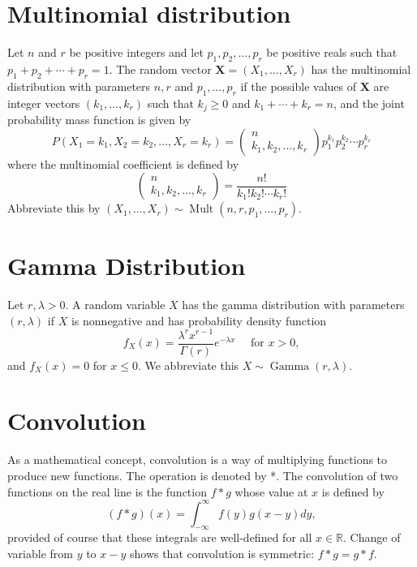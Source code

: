 \documentclass[11pt]{elegantbook}
\begin{document}
\section{Multinomial distribution}
\begin{definition}
Let $n$ and $r$ be positive integers and let $p_1, p_2, \ldots, p_r$ be positive reals such that $p_1+p_2+\cdots+p_r=1$. The random vector $\mathbf{X}=\left(X_1, \ldots, X_r\right)$ has the multinomial distribution with parameters $n, r$ and $p_1, \ldots, p_r$ if the possible values of $\mathbf{X}$ are integer vectors $\left(k_1, \ldots, k_r\right)$ such that $k_j \geq 0$ and $k_1+\cdots+k_r=n$, and the joint probability mass function is given by
$$
P\left(X_1=k_1, X_2=k_2, \ldots, X_r=k_r\right)=\left(\begin{array}{c}
n \\
k_1, k_2, \ldots, k_r
\end{array}\right) p_1^{k_1} p_2^{k_2} \cdots p_r^{k_r}
$$
where the multinomial coefficient is defined by
$$
\left(\begin{array}{c}
n \\
k_1, k_2, \ldots, k_r
\end{array}\right)=\frac{n !}{k_{1} ! k_{2} ! \cdots k_{r} !}
$$
Abbreviate this by $\left(X_1, \ldots, X_r\right) \sim \operatorname{Mult}\left(n, r, p_1, \ldots, p_r\right)$.
\end{definition}

\section{Gamma Distribution}
\begin{definition}
Let $r, \lambda>0$. A random variable $X$ has the gamma distribution with parameters $(r, \lambda)$ if $X$ is nonnegative and has probability density function
$$
f_X(x)=\frac{\lambda^r x^{r-1}}{\Gamma(r)} e^{-\lambda x} \quad \text { for } x>0,
$$
and $f_X(x)=0$ for $x \leq 0$. We abbreviate this $X \sim \operatorname{Gamma}(r, \lambda)$.
\end{definition}
\section{Convolution}

\begin{definition}
    As a mathematical concept, convolution is a way of multiplying functions to produce new functions. The operation is denoted by *. The convolution of two functions on the real line is the function $f * g$ whose value at $x$ is defined by
$$
(f * g)(x)=\int_{-\infty}^{\infty} f(y) g(x-y) d y,
$$
provided of course that these integrals are well-defined for all $x \in \mathbb{R}$. Change of variable from $y$ to $x-y$ shows that convolution is symmetric: $f * g=g * f$.
\end{definition}
\end{document}
